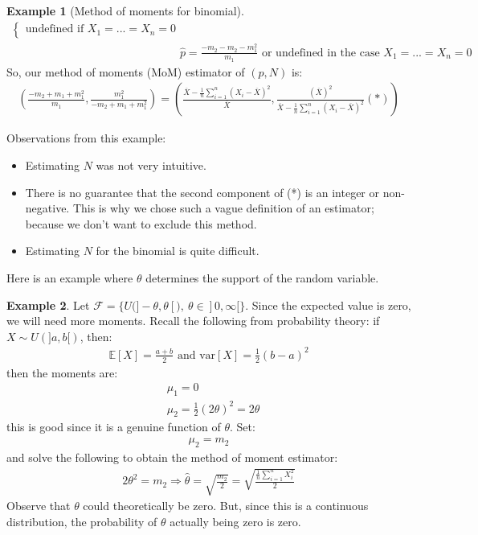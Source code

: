 \documentclass[11pt]{scrartcl}
\theoremstyle{definition}
\newtheorem{ex}{Example}
\theoremstyle{remark}
\newcommand{\dist}[0]{\mathcal{F}}
\newcommand{\EX}[1]{\mathbb{E}\left[#1 \right]}
\begin{document}
\begin{ex}[Method of moments for binomial]
\begin{align*}
\begin{cases}
				\text{undefined if } X_1 = ... = X_n = 0 
		\end{cases}	 \\
		& \hat{p} = \frac{-m_2 - m_2 - m_1^2}{m_1} \text{ or undefined in the case } X_1 = ... = X_n = 0 
	\end{align*}
	So, our method of moments (MoM) estimator of $(p, N)$ is: 
	\begin{align*}
		\left( \frac{-m_2 + m_1 + m_1^2}{m_1} , \frac{m_1^2}{-m_2 + m_1 + m_1^2}  \right) = \left( \frac{\overline{X} - \frac{1}{n} \sum_{i=1}^n (X_i - \overline{X})^2}{\overline{X}} , \frac{(\overline{X})^2}{\overline{X} - \frac{1}{n} \sum_{i=1}^n (X_i - \overline{X})^2}  (*) \right) 	
	\end{align*}
\end{ex}
	Observations from this example: 
	\begin{itemize}[noitemsep]
		\item Estimating $N$ was not very intuitive. 
		\item There is no guarantee that the second component of (*) is an integer or non-negative. This is why we chose such a vague definition of an estimator; because we don't want to exclude this method. 
		\item Estimating $N$ for the binomial is quite difficult. 
	\end{itemize}
	
	Here is an example where $\theta$ determines the support of the random variable. 
	
\begin{ex} 
	Let $\dist = \{ U (]-\theta, \theta[),\ \theta \in ]0, \infty[ \}$. 	Since the expected value is zero, we will need more moments. Recall the following from probability theory: if $X \sim U(]a,b[)$, then: 
	\begin{align*}
		\EX{X} = \frac{a+b}{2} 	\text{ and } \text{var}[X] = \frac{1}{2} (b-a)^2
	\end{align*}
	then the moments are: 
	\begin{align*}
		& \mu_1 = 0 \\
		& \mu_2 = \frac{1}{2} (2 \theta)^2 = 2 \theta 	
	\end{align*}
	this is good since it is a genuine function of $\theta$. Set: 
	\begin{align*}
		\mu_2 = m_2	
	\end{align*}
	and solve the following to obtain the method of moment estimator: 
	\begin{align*}
		2 \theta^2 = m_2 \Rightarrow \hat{\theta} = \sqrt{\frac{m_2}{2}} = \sqrt{\frac{\frac{1}{n} \sum_{i=1}^n X_i^2}{2}}	
	\end{align*}
	Observe that $\theta$ could theoretically be zero. But, since this is a continuous distribution, the probability of $\theta$ actually being zero is zero. 
\end{ex}
\end{document}
